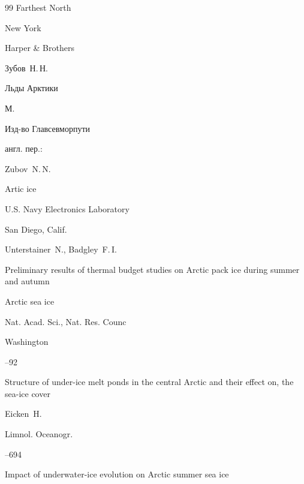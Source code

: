 \begin{thebibliography}{99}
\book Farthest North

\publaddr New York

\publ Harper \& Brothers







\by Зубов~Н.\,Н.

\book Льды Арктики

\publaddr М.

\publ Изд-во Главсевморпути



\transl англ. пер.: {} 

\by Zubov~N.\,N.

\book Artic ice



\publ U.S. Navy Electronics Laboratory

\publaddr San Diego, Calif.








\by Unterstainer~N., Badgley~F.\,I.

\paper Preliminary results of thermal budget studies on Arctic pack ice during summer and autumn

\inbook Arctic sea ice

\publ Nat. Acad. Sci., Nat. Res. Counc

\publaddr Washington


--92




\paper Structure of under-ice melt ponds in the central Arctic and their effect on, the sea-ice cover

\by Eicken~H.

\jour Limnol. Oceanogr.




--694






\paper Impact of underwater-ice evolution on Arctic summer sea ice


\end{thebibliography}
